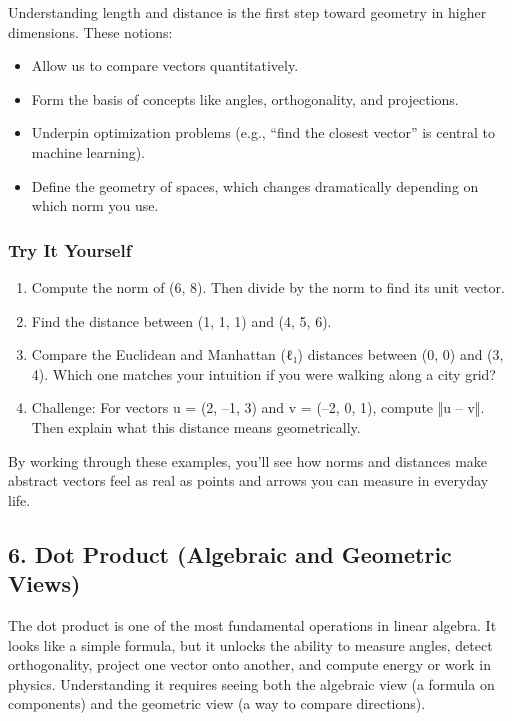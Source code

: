 \documentclass[
  letterpaper,
  DIV=11,
  numbers=noendperiod]{scrreprt}
\providecommand{\tightlist}{%
  \setlength{\itemsep}{0pt}\setlength{\parskip}{0pt}}
\begin{document}
Understanding length and distance is the first step toward geometry in
higher dimensions. These notions:

\begin{itemize}
\tightlist
\item
  Allow us to compare vectors quantitatively.
\item
  Form the basis of concepts like angles, orthogonality, and
  projections.
\item
  Underpin optimization problems (e.g., ``find the closest vector'' is
  central to machine learning).
\item
  Define the geometry of spaces, which changes dramatically depending on
  which norm you use.
\end{itemize}

\subsubsection{Try It Yourself}\label{try-it-yourself-4}

\begin{enumerate}
\def\labelenumi{\arabic{enumi}.}
\tightlist
\item
  Compute the norm of (6, 8). Then divide by the norm to find its unit
  vector.
\item
  Find the distance between (1, 1, 1) and (4, 5, 6).
\item
  Compare the Euclidean and Manhattan (ℓ₁) distances between (0, 0) and
  (3, 4). Which one matches your intuition if you were walking along a
  city grid?
\item
  Challenge: For vectors u = (2, --1, 3) and v = (--2, 0, 1), compute ‖u
  -- v‖. Then explain what this distance means geometrically.
\end{enumerate}

By working through these examples, you'll see how norms and distances
make abstract vectors feel as real as points and arrows you can measure
in everyday life.

\subsection{6. Dot Product (Algebraic and Geometric
Views)}\label{dot-product-algebraic-and-geometric-views}

The dot product is one of the most fundamental operations in linear
algebra. It looks like a simple formula, but it unlocks the ability to
measure angles, detect orthogonality, project one vector onto another,
and compute energy or work in physics. Understanding it requires seeing
both the algebraic view (a formula on components) and the geometric view
(a way to compare directions).
\end{document}
